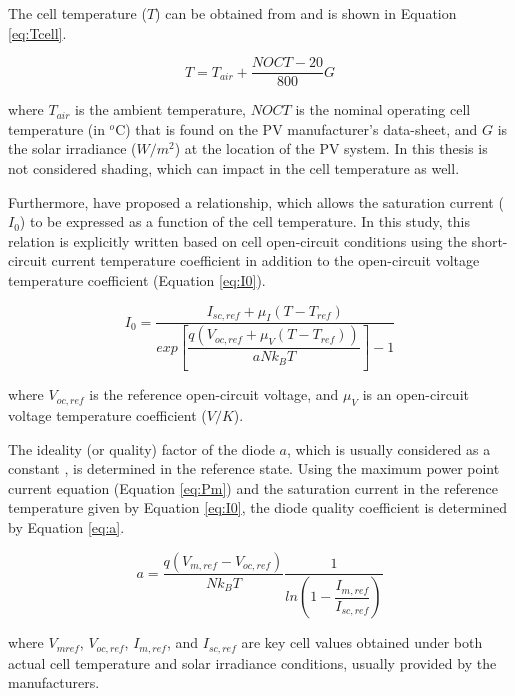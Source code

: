 The cell temperature ($ T $) can be obtained from \cite{Ross} and is shown in Equation \ref{eq:Tcell}.

\begin{equation}
\label{eq:Tcell}
T = T_{air} + \dfrac{NOCT-20}{800}G
\end{equation}

\noindent where $ T_{air} $ is the ambient temperature, $NOCT$ is the nominal operating cell temperature (in $^{o}$C) that is found on the PV manufacturer's data-sheet, and $G$ is the solar irradiance ($ W/m^{2} $) at the location of the PV system. In this thesis is not considered shading, which can impact in the cell temperature as well.

Furthermore, \cite{Villalva} have proposed a relationship, which allows the saturation current ($ I_{0} $) to be expressed as a function of the cell temperature. In this study, this relation is explicitly written based on cell open-circuit conditions using the short-circuit current temperature coefficient in addition to the open-circuit voltage temperature coefficient (Equation \ref{eq:I0}).

\begin{equation}
\label{eq:I0}
I_{0} = \dfrac{I_{sc,ref} + \mu_{I}(T - T_{ref})}{exp \left[ \dfrac{q(V_{oc,ref} + \mu_{V} (T - T_{ref}))}{aNk_{B}T}    \right] -1}
\end{equation}

\noindent where $ V_{oc,ref} $ is the reference open-circuit voltage, and $ \mu_{V} $ is an open-circuit voltage temperature coefficient ($ V/K $).

The ideality (or quality) factor of the diode $ a $, which is usually considered as a constant \cite{Villalva}, is determined in the reference state. Using the maximum power point current equation (Equation \ref{eq:Pm}) and the saturation current in the reference temperature given by Equation \ref{eq:I0}, the diode quality coefficient is determined by Equation \ref{eq:a}.

\begin{equation}
\label{eq:a}
a = \dfrac{q(V_{m,ref}-V_{oc,ref})}{Nk_{B}T} \dfrac{1}{ln \left( 1 - \dfrac{I_{m,ref}}{I_{sc,ref}}  \right) }
\end{equation}

\noindent where $ V_{mref} $, $ V_{oc,ref} $, $ I_{m,ref} $, and $ I_{sc,ref} $ are key cell values obtained under both actual cell temperature and solar irradiance conditions, usually provided by the manufacturers.

